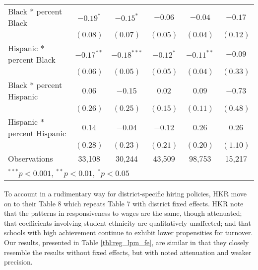 \documentclass[12pt,]{article}
\begin{document}
\begin{sidewaystable}
\begin{center}
\begin{tabular}{l c c c c c }
\quad Black * percent Black                 & $-0.19^{*}$  & $-0.15^{*}$   & $-0.06$      & $-0.04$      & $-0.17$      \\
                                            & $(0.08)$     & $(0.07)$      & $(0.05)$     & $(0.04)$     & $(0.12)$     \\
\quad Hispanic * percent Black              & $-0.17^{**}$ & $-0.18^{***}$ & $-0.12^{*}$  & $-0.11^{**}$ & $-0.09$      \\
                                            & $(0.06)$     & $(0.05)$      & $(0.05)$     & $(0.04)$     & $(0.33)$     \\
\quad Black * percent Hispanic              & $0.06$       & $-0.15$       & $0.02$       & $0.09$       & $-0.73$      \\
                                            & $(0.26)$     & $(0.25)$      & $(0.15)$     & $(0.11)$     & $(0.48)$     \\
\quad Hispanic * percent Hispanic           & $0.14$       & $-0.04$       & $-0.12$      & $0.26$       & $0.26$       \\
                                            & $(0.28)$     & $(0.23)$      & $(0.21)$     & $(0.20)$     & $(1.10)$     \\
\hline
Observations                                & 33,108        & 30,244         & 43,509        & 98,753        & 15,217        \\
\hline
\multicolumn{6}{l}{\scriptsize{$^{***}p<0.001$, $^{**}p<0.01$, $^*p<0.05$}}
\end{tabular}
\caption{Estimated Effects of Starting Teacher Salary and Student Demographic Characteristics on the Probability that Teachers Leave School Districts with District Fixed Effects, by Experience (linear probability models; Huber-White standard errors in parentheses)}
\label{tbl:reg_lpm_fe}
\end{center}
\end{sidewaystable}

To account in a rudimentary way for district-specific hiring policies,
HKR move on to their Table 8 which repeats Table 7 with district fixed
effects. HKR note that the patterns in responsiveness to wages are the
same, though attenuated; that coefficients involving student ethnicity
are qualitatively unaffected; and that schools with high achievement
continue to exhibit lower propensities for turnover. Our results,
presented in Table \ref{tbl:reg_lpm_fe}, are similar in that they
closely resemble the results without fixed effects, but with noted
attenuation and weaker precision.
\end{document}
